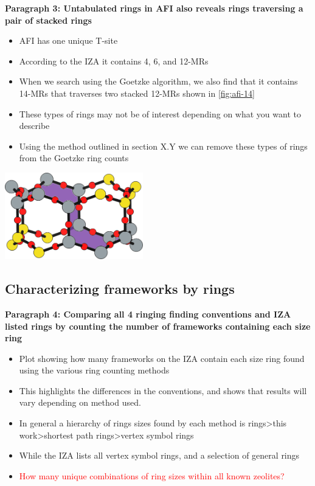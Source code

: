 \documentclass[11pt]{article}
\newcommand{\red}[1]{\textcolor{red}{#1}}
\begin{document}
\textbf{\textbf{Paragraph 3: Untabulated rings in AFI also reveals rings traversing a pair of stacked rings}}
\begin{itemize}
\item AFI has one unique T-site
\item According to the IZA it contains 4, 6, and 12-MRs
\item When we search using the Goetzke algorithm, we also find that it contains 14-MRs that traverses two stacked 12-MRs shown in \cref{fig:afi-14}
\item These types of rings may not be of interest depending on what you want to describe
\item Using the method outlined in section X.Y we can remove these types of rings from the Goetzke ring counts
\end{itemize}
\begin{center}
\includegraphics[width=0.45\textwidth]{../figures/completed-figures/afi-14.pdf}
\end{center}

\subsection{Characterizing frameworks by rings}
\label{sec:org8b6927e}
\textbf{\textbf{Paragraph 4: Comparing all 4 ringing finding conventions and IZA listed rings by counting the number of frameworks containing each size ring}}
\begin{itemize}
\item Plot showing how many frameworks on the IZA contain each size ring found using the various ring counting methods
\item This highlights the differences in the conventions, and shows that results will vary depending on method used.
\item In general a hierarchy of rings sizes found by each method is rings>this work>shortest path rings>vertex symbol rings
\item While the IZA lists all vertex symbol rings, and a selection of general rings
\item \red{How many unique combinations of ring sizes within all known zeolites?}
\end{itemize}
\end{document}
